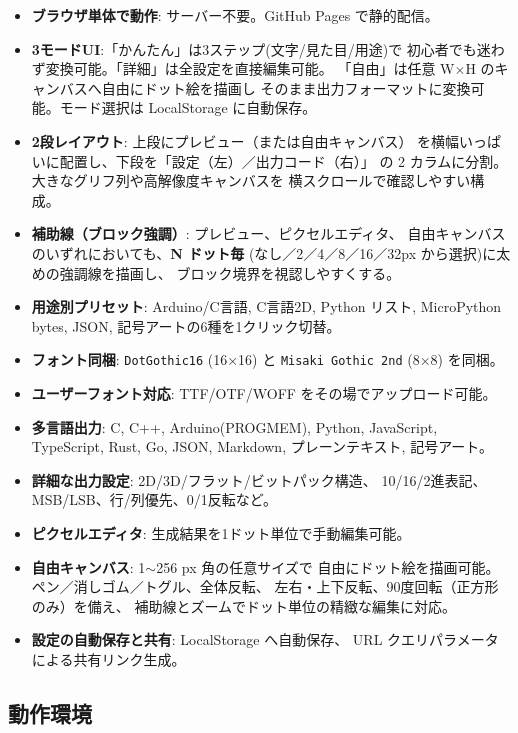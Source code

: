 \begin{itemize}[leftmargin=*,itemsep=2pt]
  \item \textbf{ブラウザ単体で動作}: サーバー不要。GitHub Pages で静的配信。
  \item \textbf{3モードUI}:「かんたん」は3ステップ(文字/見た目/用途)で
        初心者でも迷わず変換可能。「詳細」は全設定を直接編集可能。
        「自由」は任意 W$\times$H のキャンバスへ自由にドット絵を描画し
        そのまま出力フォーマットに変換可能。モード選択は LocalStorage
        に自動保存。
  \item \textbf{2段レイアウト}: 上段にプレビュー（または自由キャンバス）
        を横幅いっぱいに配置し、下段を「設定（左）／出力コード（右）」
        の 2 カラムに分割。大きなグリフ列や高解像度キャンバスを
        横スクロールで確認しやすい構成。
  \item \textbf{補助線（ブロック強調）}: プレビュー、ピクセルエディタ、
        自由キャンバスのいずれにおいても、\textbf{N ドット毎}
        (なし／2／4／8／16／32px から選択)に太めの強調線を描画し、
        ブロック境界を視認しやすくする。
  \item \textbf{用途別プリセット}: Arduino/C言語, C言語2D, Python リスト,
        MicroPython bytes, JSON, 記号アートの6種を1クリック切替。
  \item \textbf{フォント同梱}: \texttt{DotGothic16} (16×16) と
        \texttt{Misaki Gothic 2nd} (8×8) を同梱。
  \item \textbf{ユーザーフォント対応}: TTF/OTF/WOFF をその場でアップロード可能。
  \item \textbf{多言語出力}: C, C++, Arduino(PROGMEM), Python, JavaScript,
        TypeScript, Rust, Go, JSON, Markdown, プレーンテキスト, 記号アート。
  \item \textbf{詳細な出力設定}: 2D/3D/フラット/ビットパック構造、
        10/16/2進表記、MSB/LSB、行/列優先、0/1反転など。
  \item \textbf{ピクセルエディタ}: 生成結果を1ドット単位で手動編集可能。
  \item \textbf{自由キャンバス}: 1$\sim$256 px 角の任意サイズで
        自由にドット絵を描画可能。ペン／消しゴム／トグル、全体反転、
        左右・上下反転、90度回転（正方形のみ）を備え、
        補助線とズームでドット単位の精緻な編集に対応。
  \item \textbf{設定の自動保存と共有}: LocalStorage へ自動保存、
        URL クエリパラメータによる共有リンク生成。
\end{itemize}

\subsection{動作環境}

